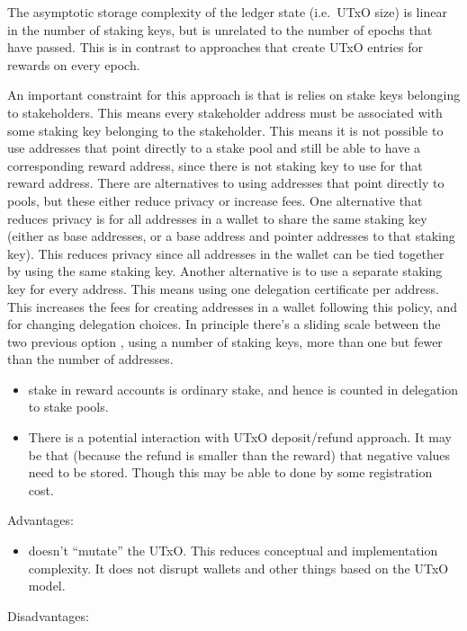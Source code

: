 \documentclass[11pt,a4paper,dvipsnames,twosided]{article}
\begin{document}
The asymptotic storage complexity of the ledger state (i.e.~UTxO size)
is linear in the number of staking keys, but is unrelated to the number of
epochs that have passed. This is in contrast to approaches that create
UTxO entries for rewards on every epoch.

An important constraint for this approach is that is relies on stake
keys belonging to stakeholders. This means every stakeholder address
must be associated with some staking key belonging to the stakeholder.
This means it is not possible to use addresses that point directly to a
stake pool and still be able to have a corresponding reward address,
since there is not staking key to use for that reward address. There are
alternatives to using addresses that point directly to pools, but these
either reduce privacy or increase fees. One alternative that reduces
privacy is for all addresses in a wallet to share the same staking key
(either as base addresses, or a base address and pointer addresses to
that staking key). This reduces privacy since all addresses in the wallet
can be tied together by using the same staking key. Another alternative is
to use a separate staking key for every address. This means using one
delegation certificate per address. This increases the fees for creating
addresses in a wallet following this policy, and for changing delegation
choices. In principle there's a sliding scale between the two previous
option , using a number of staking keys, more than one but fewer than the
number of addresses.

\begin{itemize}
\item
  stake in reward accounts is ordinary stake, and hence is counted in
  delegation to stake pools.
\item
  There is a potential interaction with UTxO deposit/refund approach. It
  may be that (because the refund is smaller than the reward) that
  negative values need to be stored. Though this may be able to done by
  some registration cost.
\end{itemize}

Advantages:

\begin{itemize}
\item
  doesn't ``mutate'' the UTxO. This reduces conceptual and
  implementation complexity. It does not disrupt wallets and other
  things based on the UTxO model.
\end{itemize}

Disadvantages:
\end{document}
